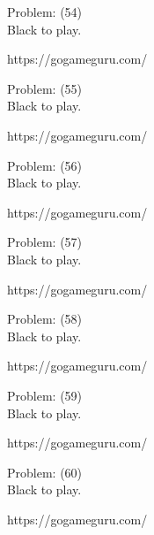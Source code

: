 \documentclass[11pt]{article}
\begin{document}
\begin{minipage}[t]{0.5\textwidth}
  {\centering
  
  Problem: (54)\\
  Black to play.

https://gogameguru.com/\\
  }
\end{minipage}
\begin{minipage}[t]{0.5\textwidth}
  {\centering
  
  Problem: (55)\\
  Black to play.

https://gogameguru.com/\\
  }
\end{minipage}
\begin{minipage}[t]{0.5\textwidth}
  {\centering
  
  Problem: (56)\\
  Black to play.

https://gogameguru.com/\\
  }
\end{minipage}
\begin{minipage}[t]{0.5\textwidth}
  {\centering
  
  Problem: (57)\\
  Black to play.

https://gogameguru.com/\\
  }
\end{minipage}
\begin{minipage}[t]{0.5\textwidth}
  {\centering
  
  Problem: (58)\\
  Black to play.

https://gogameguru.com/\\
  }
\end{minipage}
\begin{minipage}[t]{0.5\textwidth}
  {\centering
  
  Problem: (59)\\
  Black to play.

https://gogameguru.com/\\
  }
\end{minipage}
\begin{minipage}[t]{0.5\textwidth}
  {\centering
  
  Problem: (60)\\
  Black to play.

https://gogameguru.com/\\
  }
\end{minipage}
\end{document}
